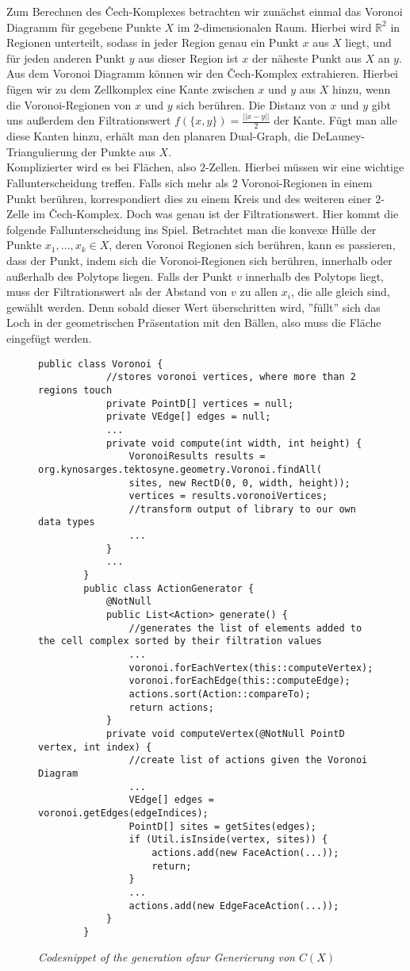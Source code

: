 \documentclass[11pt, a4paper,draft]{report}
\newcommand{\bR}{\mathbb{R}}
\begin{document}
	Zum Berechnen des Čech-Komplexes betrachten wir zunächst einmal das Voronoi Diagramm für gegebene Punkte $X$ im $2$-dimensionalen Raum. Hierbei wird $\bR^2$ in Regionen unterteilt, sodass in jeder Region genau ein Punkt $x$ aus $X$ liegt, und für jeden anderen Punkt $y$ aus dieser Region ist $x$ der näheste Punkt aus $X$ an $y$.\\
	Aus dem Voronoi Diagramm können wir den Čech-Komplex extrahieren. Hierbei fügen wir zu dem Zellkomplex eine Kante zwischen $x$ und $y$ aus $X$ hinzu, wenn die Voronoi-Regionen von $x$ und $y$ sich berühren. Die Distanz von $x$ und $y$ gibt uns außerdem den Filtrationswert $f(\{x,y\}) = \frac{||x-y||}{2}$ der Kante. Fügt man alle diese Kanten hinzu, erhält man den planaren Dual-Graph, die DeLauney-Triangulierung der Punkte aus $X$.\\
	Komplizierter wird es bei Flächen, also $2$-Zellen. Hierbei müssen wir eine wichtige Fallunterscheidung treffen. Falls sich mehr als $2$ Voronoi-Regionen in einem Punkt berühren, korrespondiert dies zu einem Kreis und des weiteren einer $2$-Zelle im Čech-Komplex. Doch was genau ist der Filtrationswert. Hier kommt die folgende Fallunterscheidung ins Spiel. Betrachtet man die konvexe Hülle der Punkte $x_1,\ldots,x_k\in X$, deren Voronoi Regionen sich berühren, kann es passieren, dass der Punkt, indem sich die Voronoi-Regionen sich berühren, innerhalb oder außerhalb des Polytops liegen. Falls der Punkt $v$ innerhalb des Polytops liegt, muss der Filtrationswert als der Abstand von $v$ zu allen $x_i$, die alle gleich sind, gewählt werden. Denn sobald dieser Wert überschritten wird, ''füllt'' sich das Loch in der geometrischen Präsentation mit den Bällen, also muss die Fläche eingefügt werden.\\
 	\lstset{language=Java}
 	\begin{figure}
 		\begin{lstlisting}[frame=single]
 		public class Voronoi {
	 		//stores voronoi vertices, where more than 2 regions touch
	 		private PointD[] vertices = null;
	 		private VEdge[] edges = null;
	 		...
	 		private void compute(int width, int height) {
		 		VoronoiResults results = org.kynosarges.tektosyne.geometry.Voronoi.findAll(
		 		sites, new RectD(0, 0, width, height));
		 		vertices = results.voronoiVertices;
		 		//transform output of library to our own data types
		 		...
	 		}
	 		...
 		}
 		public class ActionGenerator {
	 		@NotNull
	 		public List<Action> generate() {
		 		//generates the list of elements added to the cell complex sorted by their filtration values
		 		...
		 		voronoi.forEachVertex(this::computeVertex);
		 		voronoi.forEachEdge(this::computeEdge);
		 		actions.sort(Action::compareTo);
		 		return actions;
		 	}
		 	private void computeVertex(@NotNull PointD vertex, int index) {
		 		//create list of actions given the Voronoi Diagram
		 		...
		 		VEdge[] edges = voronoi.getEdges(edgeIndices);
		 		PointD[] sites = getSites(edges);
		 		if (Util.isInside(vertex, sites)) {
		 			actions.add(new FaceAction(...));
		 			return;
		 		}
		 		...
		 		actions.add(new EdgeFaceAction(...));
	 		}
 		}
 		\end{lstlisting}
 		\caption{\textit{Codesnippet of the generation ofzur Generierung von $C(X)$}}
 		\label{fig3}
 	\end{figure}
\end{document}
